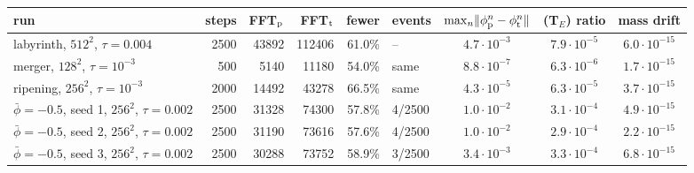 \begin{tabular}{lrrrrlccc}
\toprule
run & steps & FFT$_{\rm p}$ & FFT$_{\rm t}$ & fewer & events & $\max_n\lVert \phi_{\rm p}^n-\phi_{\rm t}^n\rVert$ & (T$_E$) ratio & mass drift\\
\midrule
labyrinth, $512^2$, $\tau=0.004$ & 2500 & 43892 & 112406 & 61.0\% & -- & $4.7\cdot10^{-3}$ & $7.9\cdot10^{-5}$ & $6.0\cdot10^{-15}$\\
merger, $128^2$, $\tau=10^{-3}$ & 500 & 5140 & 11180 & 54.0\% & same & $8.8\cdot10^{-7}$ & $6.3\cdot10^{-6}$ & $1.7\cdot10^{-15}$\\
ripening, $256^2$, $\tau=10^{-3}$ & 2000 & 14492 & 43278 & 66.5\% & same & $4.3\cdot10^{-5}$ & $6.3\cdot10^{-5}$ & $3.7\cdot10^{-15}$\\
$\bar\phi=-0.5$, seed 1, $256^2$, $\tau=0.002$ & 2500 & 31328 & 74300 & 57.8\% & 4/2500 & $1.0\cdot10^{-2}$ & $3.1\cdot10^{-4}$ & $4.9\cdot10^{-15}$\\
$\bar\phi=-0.5$, seed 2, $256^2$, $\tau=0.002$ & 2500 & 31190 & 73616 & 57.6\% & 4/2500 & $1.0\cdot10^{-2}$ & $2.9\cdot10^{-4}$ & $2.2\cdot10^{-15}$\\
$\bar\phi=-0.5$, seed 3, $256^2$, $\tau=0.002$ & 2500 & 30288 & 73752 & 58.9\% & 3/2500 & $3.4\cdot10^{-3}$ & $3.3\cdot10^{-4}$ & $6.8\cdot10^{-15}$\\
\bottomrule
\end{tabular}
